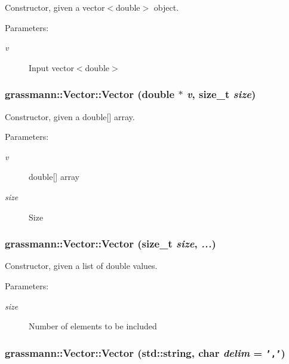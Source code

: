 Constructor, given a vector$<$double$>$ object. 

\begin{Desc}
\item[Parameters:]
\begin{description}
\item[{\em v}]Input vector$<$double$>$ \end{description}
\end{Desc}
\hypertarget{classgrassmann_1_1Vector_5d7bb89bb3d2d8aa26309ca97ddcad66}{
\subsubsection[Vector]{\setlength{\rightskip}{0pt plus 5cm}grassmann::Vector::Vector (double $\ast$ {\em v}, \/  size\_\-t {\em size})}}
\label{classgrassmann_1_1Vector_5d7bb89bb3d2d8aa26309ca97ddcad66}


Constructor, given a double\mbox{[}\mbox{]} array. 

\begin{Desc}
\item[Parameters:]
\begin{description}
\item[{\em v}]double\mbox{[}\mbox{]} array \item[{\em size}]Size \end{description}
\end{Desc}
\hypertarget{classgrassmann_1_1Vector_62ece542ba7c51a22866f6b8514f33ef}{
\subsubsection[Vector]{\setlength{\rightskip}{0pt plus 5cm}grassmann::Vector::Vector (size\_\-t {\em size}, \/   {\em ...})}}
\label{classgrassmann_1_1Vector_62ece542ba7c51a22866f6b8514f33ef}


Constructor, given a list of double values. 

\begin{Desc}
\item[Parameters:]
\begin{description}
\item[{\em size}]Number of elements to be included \end{description}
\end{Desc}
\hypertarget{classgrassmann_1_1Vector_dc3bff059e17ba7d3b71310d4cd01f0b}{
\subsubsection[Vector]{\setlength{\rightskip}{0pt plus 5cm}grassmann::Vector::Vector (std::string, \/  char {\em delim} = {\tt ','})}}
\label{classgrassmann_1_1Vector_dc3bff059e17ba7d3b71310d4cd01f0b}


